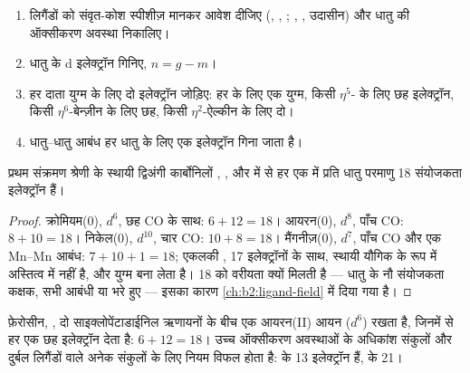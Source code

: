 \begin{method}[इलेक्ट्रॉनों की गणना]\label{met:b2:coordination-complexes:electron-count}
\begin{enumerate}
  \item लिगैंडों को संवृत-कोश स्पीशीज़ मानकर आवेश दीजिए (, ,
        ; , ,  उदासीन) और धातु की ऑक्सीकरण
        अवस्था निकालिए।
  \item धातु के d इलेक्ट्रॉन गिनिए, $n = g - m$।
  \item हर दाता युग्म के लिए दो इलेक्ट्रॉन जोड़िए: हर  के लिए एक युग्म, किसी
        $\eta^5$- के लिए छह इलेक्ट्रॉन, किसी $\eta^6$-बेन्ज़ीन के लिए छह, किसी $\eta^2$-ऐल्कीन के लिए दो।
  \item धातु--धातु आबंध हर धातु के लिए एक इलेक्ट्रॉन गिना जाता है।
\end{enumerate}
\end{method}

\begin{proposition}[धातु कार्बोनिल]\label{prop:b2:coordination-complexes:eighteen}
प्रथम संक्रमण श्रेणी के स्थायी द्विअंगी कार्बोनिलों ,
,  और  में से हर एक में प्रति धातु परमाणु 18
संयोजकता इलेक्ट्रॉन हैं।
\end{proposition}

\begin{proof}
क्रोमियम(0), $d^6$, छह CO के साथ: $6 + 12 = 18$। आयरन(0), $d^8$, पाँच CO: $8 + 10 = 18$।
निकेल(0), $d^{10}$, चार CO: $10 + 8 = 18$। मैंगनीज़(0), $d^7$, पाँच CO और एक
Mn--Mn आबंध: $7 + 10 + 1 = 18$; एकलकी , 17 इलेक्ट्रॉनों के साथ, स्थायी
यौगिक के रूप में अस्तित्व में नहीं है, और युग्म बना लेता है। 18 को वरीयता क्यों मिलती है --- धातु के नौ संयोजकता
कक्षक, सभी आबंधी या  भरे हुए --- इसका कारण
\cref{ch:b2:ligand-field} में दिया गया है।
\end{proof}

फ़ेरोसीन, , दो साइक्लोपेंटाडाईनिल ऋणायनों के बीच एक आयरन(II) आयन ($d^6$)
रखता है, जिनमें से हर एक छह इलेक्ट्रॉन देता है: $6 + 12 = 18$। उच्च ऑक्सीकरण अवस्थाओं के
अधिकांश संकुलों और दुर्बल लिगैंडों वाले अनेक संकुलों के लिए नियम विफल होता है: 
के 13 इलेक्ट्रॉन हैं,  के 21।

